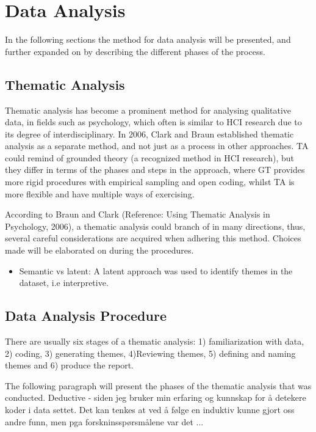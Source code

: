 \section{Data Analysis}
In the following sections the method for data analysis will be presented, and further expanded on by describing the different phases of the process.  
    \subsection{Thematic Analysis}
    Thematic analysis has become a prominent method for analysing qualitative data, in fields such as psychology, which often is similar to HCI research due to its degree of interdisciplinary. In 2006, Clark and Braun established thematic analysis as a separate method, and not just as a process in other approaches. TA could remind of grounded theory (a recognized method in HCI research), but they differ in terms of the phases and steps in the approach, where GT provides more rigid procedures with empirical sampling and open coding, whilst TA is more flexible and have multiple ways of exercising. 

According to Braun and Clark (Reference: Using Thematic Analysis in Psychology, 2006), a thematic analysis could branch of in many directions, thus, several careful considerations are acquired when adhering this method. Choices made will be elaborated on during the procedures.   
    
\begin{itemize}
\item     Semantic vs latent: A latent approach was used to identify themes in the dataset, i.e interpretive.
\end{itemize}
    
    \subsection{Data Analysis Procedure}
    There are usually six stages of a thematic analysis: 1) familiarization with data, 2) coding, 3) generating themes, 4)Reviewing themes, 5) defining and naming themes and 6) produce the report.
    
    The following paragraph will present the phases of the thematic analysis that was conducted. 
    Deductive - siden jeg bruker min erfaring og kunnskap for å detekere koder i data settet. Det kan tenkes at ved å følge en induktiv kunne gjort oss andre funn, men pga forskninsspørsmålene var det ...
    
